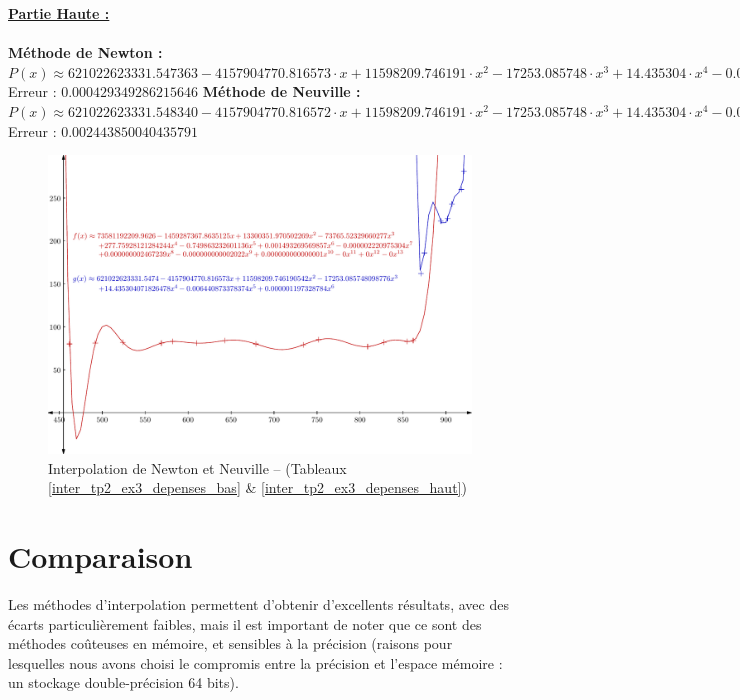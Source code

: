 \documentclass{report}
\begin{document}
	\noindent\underline{\textbf{Partie Haute :}} \\ \\
	\textbf{Méthode de Newton :}\\
	$P(x) \approx 621022623331.547363-4157904770.816573 \cdot x + 11598209.746191 \cdot x^{2} - 17253.085748 \cdot x^{3}  + 14.435304 \cdot x^{4} - 0.006441 \cdot x^{5}  + 0.000001 \cdot x^{6} $\\
	Erreur : $0.000429349286215646$
	\newline
	\newline
	\textbf{Méthode de Neuville :}\\
	$P(x) \approx 621022623331.548340-4157904770.816572 \cdot x + 11598209.746191 \cdot x^{2} - 17253.085748 \cdot x^{3}  + 14.435304 \cdot x^{4} - 0.006441 \cdot x^{5}  + 0.000001 \cdot x^{6} $\\
	Erreur : $0.002443850040435791$
      \newpage
      \begin{figure}[h]
	\centering
	\includegraphics[scale=0.85]{graphiques/pdf_output/inter_tp2_ex3.pdf}
	\caption{Interpolation de Newton et Neuville -- (Tableaux \ref{inter_tp2_ex3_depenses_bas} \& \ref{inter_tp2_ex3_depenses_haut})}
      \end{figure}
    \newpage
    \section{Comparaison}
      Les méthodes d'interpolation permettent d'obtenir d'excellents résultats, avec des écarts particulièrement faibles, mais il est important de noter que ce sont des méthodes coûteuses en mémoire, et sensibles à la précision (raisons pour lesquelles nous avons choisi le compromis entre la précision et l'espace mémoire : un stockage double-précision 64 bits).\\ \\
      
\end{document}
